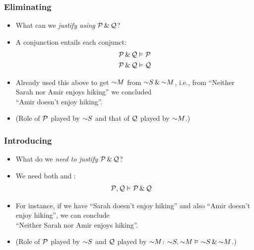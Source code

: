 \begin{frame}
  \frametitle{Eliminating \eand}

  \begin{itemize}[<+->]
    \item What can we \emph{justify using} $\mathcal{P} \,\&\, \mathcal{Q}$?
    \item A conjunction entails each conjunct:
    \begin{align*}
      & \mathcal{P} \,\&\, \mathcal{Q} \vDash \mathcal{P}\\
      & \mathcal{P} \,\&\, \mathcal{Q} \vDash \mathcal{Q}
    \end{align*}
    \item Already used this above to get $\enot M$ from $\enot S \eand
    \enot M$, i.e., from ``Neither
    Sarah nor Amir enjoys hiking'' we concluded\\
 ``Amir doesn't enjoy hiking''.
    \item (Role of $\mathcal{P}$ played by $\enot S$ and that of $\mathcal{Q}$
    played by $\enot M$.)
  \end{itemize}
\end{frame}

\begin{frame}
  \frametitle{Introducing \eand}

  \begin{itemize}[<+->]
    \item What do we \emph{need to justify} $\mathcal{P} \,\&\, \mathcal{Q}$?
    \item We need both  and :
    \begin{align*}
      & \mathcal{P}, \mathcal{Q} \vDash \mathcal{P}\,\&\, \mathcal{Q}
    \end{align*}
    \item For instance, if we have ``Sarah doesn't enjoy hiking'' and
    also ``Amir doesn't enjoy hiking'', we can conclude\\
    ``Neither
    Sarah nor Amir enjoys hiking''.
    \item (Role of $\mathcal{P}$ played by $\enot S$ and $\mathcal{Q}$
    played by $\enot M$: $\enot S, \enot M \entails \enot S \eand
    \enot M$.)
  \end{itemize}
\end{frame}

